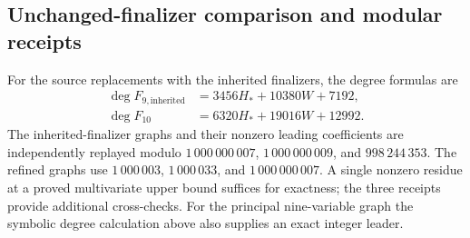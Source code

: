 \subsection{Unchanged-finalizer comparison and modular receipts}
For the source replacements with the inherited finalizers, the degree
formulas are
\begin{align*}
 \deg F_{9,\mathrm{inherited}}&=3456H_*+10380W+7192,\\
 \deg F_{10}&=6320H_*+19016W+12992.
\end{align*}
The inherited-finalizer graphs and their nonzero leading coefficients are
independently replayed modulo \(1\,000\,000\,007\), \(1\,000\,000\,009\), and
\(998\,244\,353\). The refined graphs use \(1\,000\,003\),
\(1\,000\,033\), and \(1\,000\,000\,007\).
A single nonzero residue at a proved multivariate upper bound suffices
for exactness; the three receipts provide additional cross-checks.
For the principal nine-variable graph the symbolic degree calculation
above also supplies an exact integer leader.

